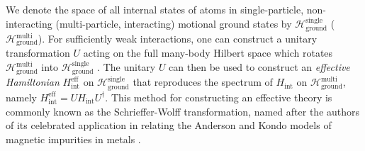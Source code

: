 \documentclass[preprint,showkeys,nofootinbib]{revtex4-1}
\renewcommand{\t}{\text} %
\renewcommand{\H}{\mathcal{H}}
\newcommand{\1}{\mathds{1}}
\begin{document}
We denote the space of all internal states of atoms in
single-particle, non-interacting (multi-particle, interacting)
motional ground states by $\H_{\t{ground}}^{\t{single}}$
($\H_{\t{ground}}^{\t{multi}}$).  For sufficiently weak interactions,
one can construct a unitary transformation $U$ acting on the full
many-body Hilbert space which rotates $\H_{\t{ground}}^{\t{multi}}$
into $\H_{\t{ground}}^{\t{single}}$ \cite{bravyi2011schrieffer}.  The
unitary $U$ can then be used to construct an {\it effective
  Hamiltonian} $H_{\t{int}}^{\t{eff}}$ on
$\H_{\t{ground}}^{\t{single}}$ that reproduces the spectrum of
$H_{\t{int}}$ on $\H_{\t{ground}}^{\t{multi}}$, namely
$H_{\t{int}}^{\t{eff}}=UH_{\t{int}}U^\dag$.  This method for
constructing an effective theory is commonly known as the
Schrieffer-Wolff transformation, named after the authors of its
celebrated application in relating the Anderson and Kondo models of
magnetic impurities in metals \cite{schrieffer1966relation}.
\end{document}
